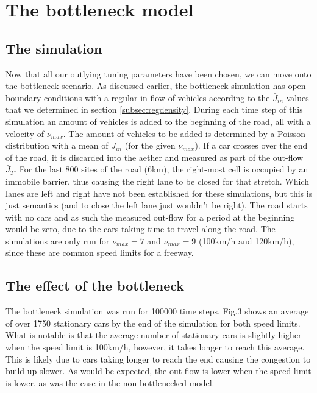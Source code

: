 \documentclass[11pt]{article}
\begin{document}
	\newpage
	
	\section{The bottleneck model}\label{sec:regbottle}
	
	\subsection{The simulation}\label{subsec:bottlesim}
	
	Now that all our outlying tuning parameters have been chosen, we can move onto the bottleneck scenario. As discussed earlier, the bottleneck simulation has open boundary conditions with a regular in-flow of vehicles according to the $\bar{J}_{in}$ values that we determined in section \ref{subsec:regdensity}. During each time step of this simulation an amount of vehicles is added to the beginning of the road, all with a velocity of $\nu_{max}$. The amount of vehicles to be added is determined by a Poisson distribution with a mean of $\bar{J}_{in}$ (for the given $\nu_{max}$). If a car crosses over the end of the road, it is discarded into the aether and measured as part of the out-flow $\bar{J}_T$. For the last 800 sites of the road (6km), the right-most cell is occupied by an immobile barrier, thus causing the right lane to be closed for that stretch. Which lanes are left and right have not been established for these simulations, but this is just semantics (and to close the left lane just wouldn't be right). The road starts with no cars and as such the measured out-flow for a period at the beginning would be zero, due to the cars taking time to travel along the road. The simulations are only run for $\nu_{max}=7$ and $\nu_{max}=9$ (100km/h and 120km/h), since these are common speed limits for a freeway.\\
	
	\subsection{The effect of the bottleneck}\label{subsec:effbot}
	
	The bottleneck simulation was run for 100000 time steps. Fig.3 shows an average of over 1750 stationary cars by the end of the simulation for both speed limits. What is notable is that the average number of stationary cars is slightly higher when the speed limit is 100km/h, however, it takes longer to reach this average. This is likely due to cars taking longer to reach the end causing the congestion to build up slower. As would be expected, the out-flow is lower when the speed limit is lower, as was the case in the non-bottlenecked model.\\
	
\end{document}
